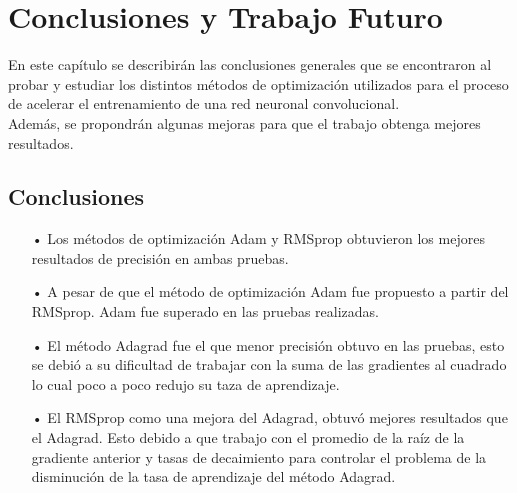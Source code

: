 \chapter{Conclusiones y Trabajo Futuro}
En este capítulo se describirán las conclusiones generales que se encontraron al probar y estudiar los distintos métodos de optimización utilizados para el proceso de acelerar el entrenamiento de una red neuronal convolucional.\\ Además, se propondrán algunas mejoras para que el trabajo obtenga mejores resultados.


\section{Conclusiones}


\begin{itemize}

\item[•] Los métodos de optimización Adam y RMSprop obtuvieron los mejores resultados de precisión en ambas pruebas.
\item[•] A pesar de que el método de optimización Adam fue propuesto a partir del RMSprop. Adam fue superado en las pruebas realizadas.
\item[•] El método Adagrad fue el que menor precisión obtuvo en las pruebas, esto se debió a su dificultad de trabajar con la suma de las gradientes al cuadrado lo cual poco a poco redujo su taza de aprendizaje.
\item[•] El RMSprop como una mejora del Adagrad, obtuvó mejores resultados que el Adagrad. Esto debido a que trabajo con el promedio de la raíz de la gradiente anterior y tasas de decaimiento para controlar el problema de la disminución de la tasa de aprendizaje del método Adagrad.

\end{itemize}


